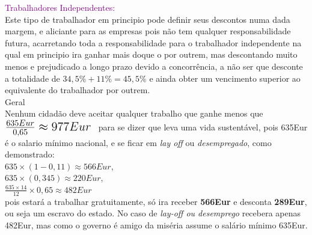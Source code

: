 \textup{\large \textcolor{purple}{Trabalhadores Independentes:}}\\

Este tipo de trabalhador em principio pode definir seus descontos numa dada margem, e aliciante para as empresas pois não tem qualquer responsabilidade futura, acarretando toda a responsabilidade para o trabalhador independente na qual em principio ira ganhar mais doque o por outrem, mas descontando muito menos e prejudicado a longo prazo devido a concorrência, a não ser que desconte a totalidade de $34,5\%+11\%=45,5\%$ e ainda obter um vencimento superior ao equivalente do trabalhador por outrem.\\

Geral\\
Nenhum cidadão deve aceitar qualquer trabalho que ganhe menos que \; $ \mbox{\Large $ \frac{635Eur}{0,65}\approx 977Eur $ } $ para se dizer que leva uma vida sustentável, pois 635Eur é o salario mínimo nacional, e se ficar em \textit{lay off} ou \textit{desempregado}, como demonstrado:\\
$635\times(1-0,11)\approx566Eur$,\\
$635\times(0,345)\approx220Eur$,\\
$\frac{635\times14}{12}\times0,65 \approx 482Eur$\\
pois estará a trabalhar gratuitamente, só ira receber \textbf{566Eur} e desconta \textbf{289Eur}, ou seja um escravo do estado. No caso de \textit{lay-off ou desemprego} recebera apenas 482Eur, mas como o governo é amigo da miséria assume o salário mínimo 635Eur.\\

